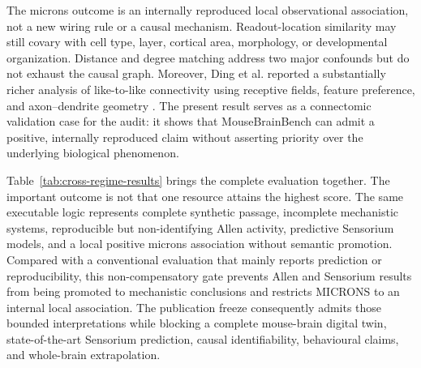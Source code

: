 \documentclass[a4paper,fleqn]{cas-sc}
\begin{document}
The \acs{microns} outcome is an internally reproduced local observational association, not a new
wiring rule or a causal mechanism. Readout-location similarity may still covary
with cell type, layer, cortical area, morphology, or developmental organization.
Distance and degree matching address two major confounds but do not exhaust the
causal graph. Moreover, Ding et al. reported a substantially richer analysis of
like-to-like connectivity using receptive fields, feature preference, and
axon--dendrite geometry \citep{ding2025wiring}. The present result serves as a
connectomic validation case for the audit: it shows that MouseBrainBench can admit a
positive, internally reproduced claim without asserting priority over the
underlying biological phenomenon.

Table~\ref{tab:cross-regime-results} brings the complete evaluation together.
The important outcome is not that one resource attains the highest score. The
same executable logic represents complete synthetic passage, incomplete
mechanistic systems, reproducible but non-identifying Allen activity,
predictive Sensorium models, and a local positive \acs{microns} association without
semantic promotion. Compared with a conventional evaluation that mainly reports
prediction or reproducibility, this non-compensatory gate prevents Allen and
Sensorium results from being promoted to mechanistic conclusions and restricts
MICRONS to an internal local association. The publication freeze consequently admits those bounded
interpretations while blocking a complete mouse-brain digital twin,
state-of-the-art Sensorium prediction, causal identifiability, behavioural
claims, and whole-brain extrapolation.
\end{document}
